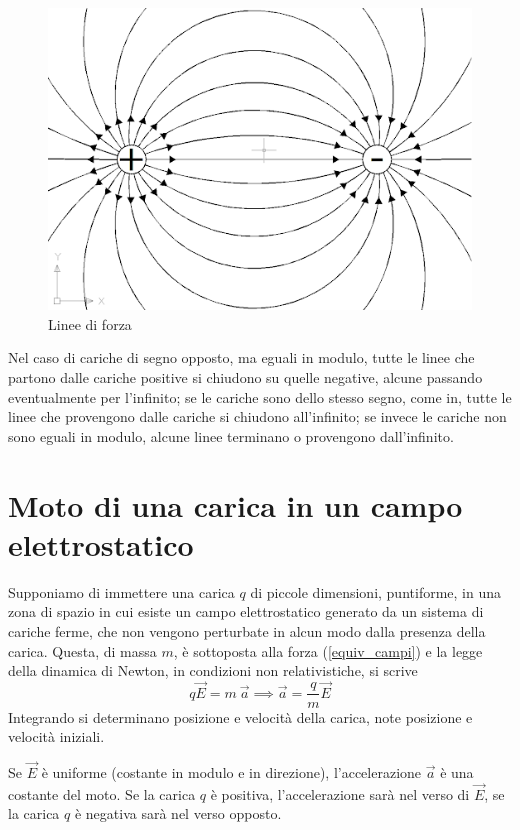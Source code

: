 \documentclass[class=book, crop=false, oneside, 12pt]{standalone}
\begin{document}
\begin{figure}[h]
    \includegraphics[scale=0.4]{linee-di-forza}
    \centering
    \caption{Linee di forza}
\end{figure}

Nel caso di cariche di segno opposto, ma eguali in modulo, tutte le linee che partono dalle cariche positive si chiudono su quelle negative, alcune passando eventualmente per l'infinito; 
se le cariche sono dello stesso segno, come in, tutte le linee che provengono dalle cariche si chiudono all'infinito; 
se invece le cariche non sono eguali in modulo, alcune linee terminano o provengono dall'infinito.

\section{Moto di una carica in un campo elettrostatico}

Supponiamo di immettere una carica \(q\) di piccole dimensioni, puntiforme, in una zona di spazio in cui esiste un campo elettrostatico generato da un sistema di cariche ferme, che non vengono perturbate in alcun modo dalla presenza della carica. 
Questa, di massa \(m\), è sottoposta alla forza (\ref{equiv_campi}) e la legge della dinamica di Newton, in condizioni non relativistiche, si scrive
\begin{equation}
    q \overrightarrow{E} = m \ \overrightarrow{a} \implies \overrightarrow{a} = \frac{q}{m} \overrightarrow{E}
\end{equation}
Integrando si determinano posizione e velocità della carica, note posizione e velocità iniziali. 

Se \(\overrightarrow{E}\) è uniforme (costante in modulo e in direzione), l'accelerazione \(\overrightarrow{a}\) è una costante del moto. 
Se la carica \(q\) è positiva, l'accelerazione sarà nel verso di \(\overrightarrow{E}\), se la carica \(q\) è negativa sarà nel verso opposto.
\end{document}
